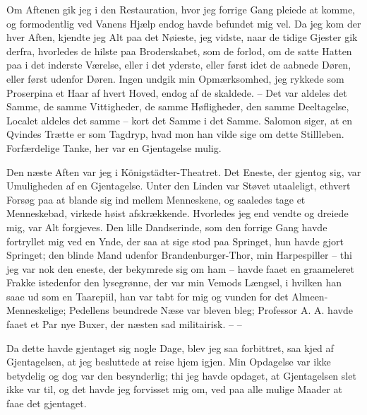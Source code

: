 \documentclass[12pt,a4paper]{article}
\begin{document}
Om Aftenen gik jeg i den Restauration, hvor jeg forrige Gang pleiede at komme, og formodentlig ved Vanens Hjælp endog havde befundet mig vel. Da jeg kom der hver Aften, kjendte jeg Alt paa det Nøieste, jeg vidste, naar de tidige Gjester gik derfra, hvorledes de hilste paa Broderskabet, som de forlod, om de satte Hatten paa i det inderste Værelse, eller i det yderste, eller først idet de aabnede Døren, eller først udenfor Døren. Ingen undgik min Opmærksomhed, jeg rykkede som Proserpina et Haar af hvert Hoved, endog af de skaldede. – Det var aldeles det Samme, de samme Vittigheder, de samme Høfligheder, den samme Deeltagelse, Localet aldeles det samme – kort det Samme i det Samme. Salomon siger, at en Qvindes Trætte er som Tagdryp, hvad mon han vilde sige om dette Stillleben. Forfærdelige Tanke, her var en Gjentagelse mulig.

Den næste Aften var jeg i Königstädter-Theatret. Det Eneste, der gjentog sig, var Umuligheden af en Gjentagelse. Unter den Linden var Støvet utaaleligt, ethvert Forsøg paa at blande sig ind mellem Menneskene, og saaledes tage et Menneskebad, virkede høist afskrækkende. Hvorledes jeg end vendte og dreiede mig, var Alt forgjeves. Den lille Dandserinde, som den forrige Gang havde fortryllet mig ved en Ynde, der saa at sige stod paa Springet, hun havde gjort Springet; den blinde Mand udenfor Brandenburger-Thor, min Harpespiller – thi jeg var nok den eneste, der bekymrede sig om ham – havde faaet en graameleret Frakke istedenfor den lysegrønne, der var min Vemods Længsel, i hvilken han saae ud som en Taarepiil, han var tabt for mig og vunden for det Almeen-Menneskelige; Pedellens beundrede Næse var bleven bleg; Professor A. A. havde faaet et Par nye Buxer, der næsten sad militairisk. – –

Da dette havde gjentaget sig nogle Dage, blev jeg saa forbittret, saa kjed af Gjentagelsen, at jeg besluttede at reise hjem igjen. Min Opdagelse var ikke betydelig og dog var den besynderlig; thi jeg havde opdaget, at Gjentagelsen slet ikke var til, og det havde jeg forvisset mig om, ved paa alle mulige Maader at faae det gjentaget.
\end{document}

